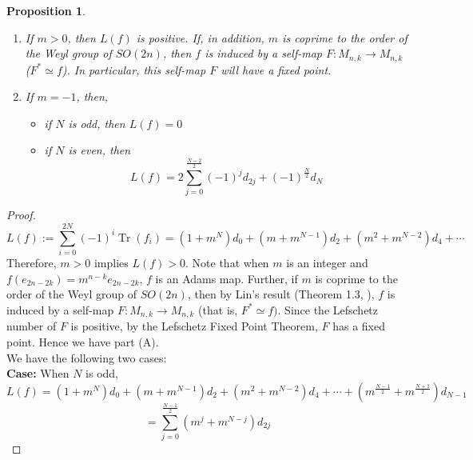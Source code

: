 \documentclass[a4paper,leqno,12pt]{amsart}
\theoremstyle{plain}
\newtheorem{prop}[thm]{Proposition}
\theoremstyle{definition}
\theoremstyle{remark}
\newcommand{\Tr}{\operatorname{Tr}}
\begin{document}
{\begin{prop}
\noindent
\begin{enumerate}
\item [(A)] If $m > 0$,  then $L(f)$ is positive.  If,  in addition,  $m$ is coprime to the order of the Weyl group of $SO(2n)$,  then $f$ is induced by a self-map $F \colon M_{n,k} \longrightarrow M_{n,k}$ ($F^{*} \simeq f$).  In particular,  this self-map $F$ will have a fixed point.  \\

\noindent
\item[(B)] If $m = -1$,  then,  
\begin{itemize}
\item[(i)] if $N$ is odd,  then $L(f) =0$ 
\item[(ii)] if $N$ is even,  then 
\begin{displaymath}
L(f) = 2 \sum_{j=0}^{\frac{N-2}{2}} (-1)^{j} d_{2j}  + (-1)^{\frac{N}{2}} d_{N}
\end{displaymath}
\end{itemize}
\end{enumerate}
\end{prop}

\begin{proof}

\noindent
 \begin{displaymath}
  L(f) :=  \sum_{i=0}^{2N} (-1)^{i} \Tr (f_{i})  
  = (1+m^{N}) d_{0} + (m + m^{N-1}) d_{2} + (m^{2} + m^{N-2}) d_{4} + \cdots 
\end{displaymath}
Therefore,  $m>0$ implies $L(f) >0$.  
Note that when $m$ is an integer and $ f(e_{2n-2k}) =  m^{n-k}e_{2n-2k}$,  $f$ is an Adams map.  Further,  if $m$ is coprime to the order of the Weyl group of $SO(2n)$,  then by Lin's result  (Theorem 1.3,  \cite{lin}),  $f$ is induced by a self-map $F \colon M_{n,k} \longrightarrow M_{n,k}$ (that is,  $F^{*} \simeq f)$.  Since the Lefschetz number of $F$ is positive,  by the Lefschetz Fixed Point Theorem,  $F$ has a fixed point.  Hence we have part (A).\\

\noindent
We have the following two cases: \\
\noindent
{\bf Case:} When $N$ is odd,  
\begin{displaymath}
L(f) = (1+m^{N}) d_{0} + (m + m^{N-1}) d_{2} + (m^{2} + m^{N-2}) d_{4} + \cdots +  (m^{\frac{N-1}{2}} + m^{\frac{N+1}{2}}) d_{N-1}
\end{displaymath}
\begin{displaymath}
= \sum_{j=0}^{\frac{N-1}{2}} (m^{j} + m^{N-j}) d_{2j}
\end{displaymath}


\end{proof}}
\end{document}
